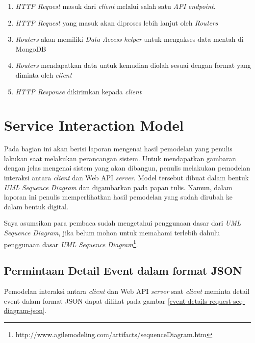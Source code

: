 \documentclass[a4paper, 12pt, oneside]{report}
\begin{document}
\begin{enumerate}
  \item \textit{HTTP Request} masuk dari \textit{client} melalui salah satu \textit{API endpoint}.
  \item \textit{HTTP Request} yang masuk akan diproses lebih lanjut oleh \textit{Routers}
  \item \textit{Routers} akan memiliki \textit{Data Access helper} untuk mengakses data mentah di MongoDB
  \item \textit{Routers} mendapatkan data untuk kemudian diolah sesuai dengan format yang diminta oleh \textit{client}
  \item \textit{HTTP Response} dikirimkan kepada \textit{client}
\end{enumerate}

\section{Service Interaction Model}

\onehalfspacing Pada bagian ini akan berisi laporan mengenai hasil pemodelan yang penulis lakukan saat melakukan perancangan sistem. Untuk mendapatkan gambaran dengan jelas mengenai sistem yang akan dibangun, penulis melakukan pemodelan interaksi antara \textit{client} dan Web API \textit{server}. Model tersebut dibuat dalam bentuk \textit{UML Sequence Diagram} dan digambarkan pada papan tulis. Namun, dalam laporan ini penulis memperlihatkan hasil pemodelan yang sudah dirubah ke dalam bentuk digital.

\onehalfspacing Saya asumsikan para pembaca sudah mengetahui penggunaan dasar dari \textit{UML Sequence Diagram}, jika belum mohon untuk memahami terlebih dahulu penggunaan dasar \textit{UML Sequence Diagram}\footnote{http://www.agilemodeling.com/artifacts/sequenceDiagram.htm}.

\newpage

\subsection{Permintaan Detail Event dalam format JSON}

\onehalfspacing Pemodelan interaksi antara \textit{client} dan Web API \textit{server} saat \textit{client} meminta detail event dalam format JSON dapat dilihat pada gambar \ref{event-details-request-seq-diagram-json}.
\end{document}
